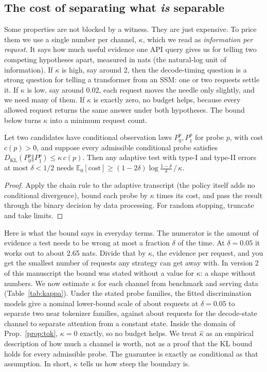 \subsection{The cost of separating what \emph{is} separable}
\label{sec:kappa}
Some properties are not blocked by a witness.  They are just expensive.  To price them
we use a single number per channel, $\kappa$, which we read as \emph{information per
request}.  It says how much useful evidence one API query gives us for telling two
competing hypotheses apart, measured in nats (the natural-log unit of information).  If
$\kappa$ is high, say around 2, then the decode-timing question is a strong question
for telling a transformer from an SSM: one or two requests settle it.  If $\kappa$ is
low, say around 0.02, each request moves the needle only slightly, and we need many of
them.  If $\kappa$ is exactly zero, no budget helps, because every allowed request
returns the same answer under both hypotheses.  The bound below turns $\kappa$ into a
minimum request count.

\begin{proposition}
\label{prop:cost}
Let two candidates have conditional observation laws $P_0^p,P_1^p$ for probe $p$, with
cost $c(p)>0$, and suppose every admissible conditional probe satisfies
$D_{\mathrm{KL}}(P_0^p\Vert P_1^p)\le\kappa\,c(p)$.  Then any adaptive test with type-I
and type-II errors at most $\delta<1/2$ needs
$\mathbb E_0[\mathrm{cost}]\ge(1-2\delta)\log\frac{1-\delta}{\delta}\,/\,\kappa$.
\end{proposition}
\begin{proof}
Apply the chain rule to the adaptive transcript (the policy itself adds no conditional
divergence), bound each probe by $\kappa$ times its cost, and pass the result through
the binary decision by data processing.  For random stopping, truncate and take limits.
\end{proof}
Here is what the bound says in everyday terms.  The numerator is the amount of evidence
a test needs to be wrong at most a fraction $\delta$ of the time.  At $\delta=0.05$ it
works out to about 2.65 nats.  Divide that by $\kappa$, the evidence per request, and
you get the smallest number of requests any strategy can get away with.  In version 2
of this manuscript the bound was stated without a value for $\kappa$: a shape without
numbers.  We now estimate $\kappa$ for each channel from benchmark and serving data
(Table~\ref{tab:kappa}).  Under the stated probe families, the fitted discrimination
models give a nominal lower-bound scale of about \KappaTokReq{} requests at
$\delta{=}0.05$ to separate two near tokenizer families, against about
\KappaTimingReq{} requests for the decode-state channel to separate attention from a
constant state.  Inside the domain of Prop.~\ref{prop:tok}, $\kappa=0$ exactly, so no
budget helps.  We treat $\hat\kappa$ as an empirical description of how much a channel
is worth, not as a proof that the KL bound holds for every admissible probe.  The
guarantee is exactly as conditional as that assumption.  In short, $\kappa$ tells us
how steep the boundary is.


